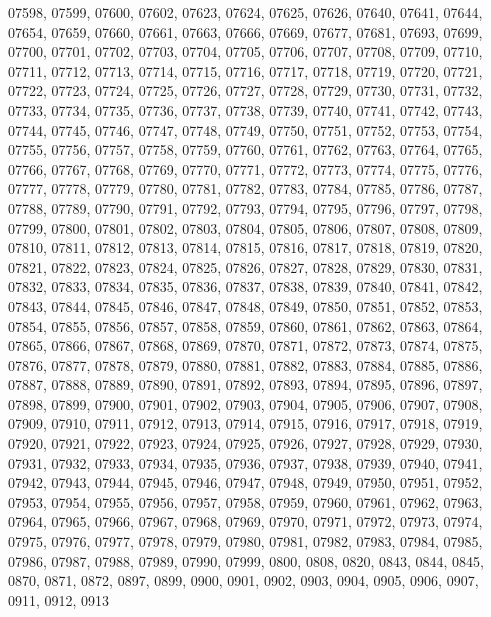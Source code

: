 {07598,
07599,
07600,
07602,
07623,
07624,
07625,
07626,
07640,
07641,
07644,
07654,
07659,
07660,
07661,
07663,
07666,
07669,
07677,
07681,
07693,
07699,
07700,
07701,
07702,
07703,
07704,
07705,
07706,
07707,
07708,
07709,
07710,
07711,
07712,
07713,
07714,
07715,
07716,
07717,
07718,
07719,
07720,
07721,
07722,
07723,
07724,
07725,
07726,
07727,
07728,
07729,
07730,
07731,
07732,
07733,
07734,
07735,
07736,
07737,
07738,
07739,
07740,
07741,
07742,
07743,
07744,
07745,
07746,
07747,
07748,
07749,
07750,
07751,
07752,
07753,
07754,
07755,
07756,
07757,
07758,
07759,
07760,
07761,
07762,
07763,
07764,
07765,
07766,
07767,
07768,
07769,
07770,
07771,
07772,
07773,
07774,
07775,
07776,
07777,
07778,
07779,
07780,
07781,
07782,
07783,
07784,
07785,
07786,
07787,
07788,
07789,
07790,
07791,
07792,
07793,
07794,
07795,
07796,
07797,
07798,
07799,
07800,
07801,
07802,
07803,
07804,
07805,
07806,
07807,
07808,
07809,
07810,
07811,
07812,
07813,
07814,
07815,
07816,
07817,
07818,
07819,
07820,
07821,
07822,
07823,
07824,
07825,
07826,
07827,
07828,
07829,
07830,
07831,
07832,
07833,
07834,
07835,
07836,
07837,
07838,
07839,
07840,
07841,
07842,
07843,
07844,
07845,
07846,
07847,
07848,
07849,
07850,
07851,
07852,
07853,
07854,
07855,
07856,
07857,
07858,
07859,
07860,
07861,
07862,
07863,
07864,
07865,
07866,
07867,
07868,
07869,
07870,
07871,
07872,
07873,
07874,
07875,
07876,
07877,
07878,
07879,
07880,
07881,
07882,
07883,
07884,
07885,
07886,
07887,
07888,
07889,
07890,
07891,
07892,
07893,
07894,
07895,
07896,
07897,
07898,
07899,
07900,
07901,
07902,
07903,
07904,
07905,
07906,
07907,
07908,
07909,
07910,
07911,
07912,
07913,
07914,
07915,
07916,
07917,
07918,
07919,
07920,
07921,
07922,
07923,
07924,
07925,
07926,
07927,
07928,
07929,
07930,
07931,
07932,
07933,
07934,
07935,
07936,
07937,
07938,
07939,
07940,
07941,
07942,
07943,
07944,
07945,
07946,
07947,
07948,
07949,
07950,
07951,
07952,
07953,
07954,
07955,
07956,
07957,
07958,
07959,
07960,
07961,
07962,
07963,
07964,
07965,
07966,
07967,
07968,
07969,
07970,
07971,
07972,
07973,
07974,
07975,
07976,
07977,
07978,
07979,
07980,
07981,
07982,
07983,
07984,
07985,
07986,
07987,
07988,
07989,
07990,
07999,
0800,
0808,
0820,
0843,
0844,
0845,
0870,
0871,
0872,
0897,
0899,
0900,
0901,
0902,
0903,
0904,
0905,
0906,
0907,
0911,
0912,
0913}
